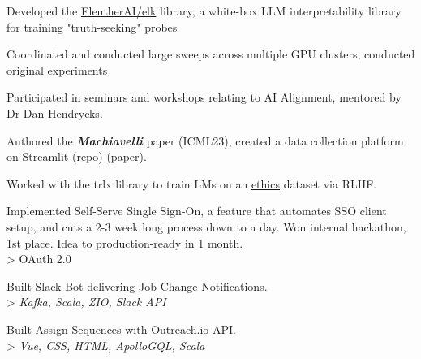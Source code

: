 \documentclass[]{deedy-resume-openfont}
\begin{document}
\begin{minipage}[t]{0.70\textwidth}
    \begin{tightemize}
    \item Developed the \href{https://github.com/EleutherAI/elk}{EleutherAI/elk} library, a white-box LLM interpretability library for training "truth-seeking" probes
    \item Coordinated and conducted large sweeps across multiple GPU clusters, conducted original experiments
    \end{tightemize}
    \sectionsep
    
    \begin{tightemize}
    \item Participated in seminars and workshops relating to AI Alignment, mentored by Dr Dan Hendrycks.
    \item Authored the \emph{\textbf{Machiavelli}}
    paper (ICML23), created a data collection platform on Streamlit (\href{https://github.com/derpyplops/cyoa-streamlit}{repo})
    (\href{https://arxiv.org/abs/2304.03279}{paper}).
    \item Worked with the trlx library to train LMs on an \href{https://github.com/hendrycks/ethics}{ethics} dataset via RLHF.
    
    \end{tightemize}
    \sectionsep
    \begin{tightemize}
    \item Implemented Self-Serve Single Sign-On, a feature that automates SSO client setup, and cuts a 2-3 week long process down to a day. 
    Won internal hackathon, 1st place. Idea to production-ready in 1 month. \\> OAuth 2.0
    \item Built Slack Bot delivering Job Change Notifications. \\ > \emph{Kafka, Scala, ZIO, Slack API}
    \item Built Assign Sequences with Outreach.io API.\\ > \emph{Vue, CSS, HTML, ApolloGQL, Scala}
    \end{tightemize}
    
    \end{minipage}
    
\end{document}
